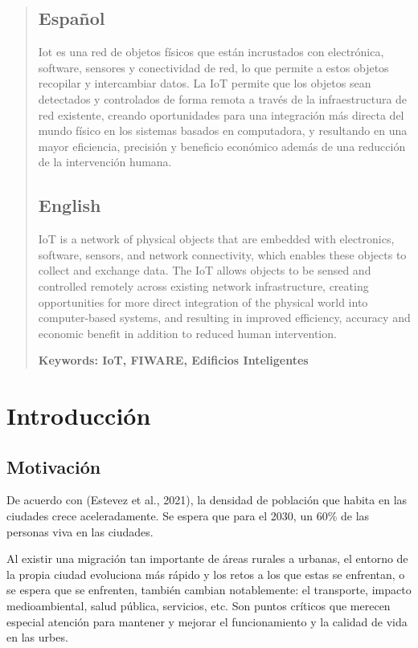 \documentclass[12pt, a4paper, twoside]{article}
\begin{document}


\newpage

\begin{abstract}

  \subsection{Español}
  Iot es una red de objetos físicos que están incrustados con electrónica, software, 
  sensores y conectividad de red, lo que permite a estos objetos recopilar y intercambiar datos.
  La IoT permite que los objetos sean detectados y controlados de forma remota a través de la 
  infraestructura de red existente, creando oportunidades para una integración más directa del mundo 
  físico en los sistemas basados en computadora, y resultando en una mayor eficiencia, precisión y 
  beneficio económico además de una reducción de la intervención humana.

  \subsection{English}
  IoT is a network of physical objects that are embedded with electronics, 
  software, sensors, and network connectivity, which enables these objects 
  to collect and exchange data. The IoT allows objects to be sensed and controlled 
  remotely across existing network infrastructure, creating opportunities for more 
  direct integration of the physical world into computer-based systems, and resulting 
  in improved efficiency, accuracy and economic benefit in addition to reduced human 
  intervention.

	\bfseries{\large{Keywords:}} IoT, FIWARE, Edificios Inteligentes
\end{abstract}

\tableofcontents

\section{Introducción}
\subsection{Motivación}
De acuerdo con (Estevez et al., 2021), la densidad de población que habita en las ciudades crece aceleradamente.
Se espera que para el 2030, un 60\% de las personas viva en las ciudades. 

Al existir una migración tan importante de áreas rurales a urbanas, el entorno de la
propia ciudad evoluciona más rápido y los retos a los que estas se enfrentan, o se espera que se enfrenten,
también cambian notablemente: el transporte, impacto medioambiental, salud pública, servicios, etc. Son puntos
críticos que merecen especial atención para mantener y mejorar el funcionamiento y la calidad de vida en
las urbes.
\end{document}
